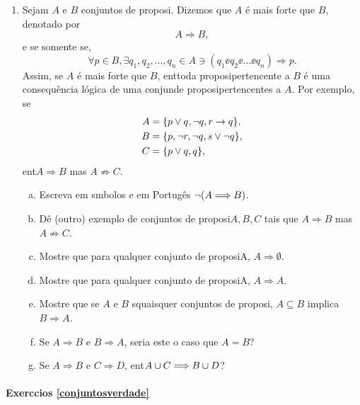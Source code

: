\begin{enumerate}[{\bf 1.}]
\item Sejam $A$ e $B$ conjuntos de proposi\cois. Dizemos que $A$ \'e mais forte que $B$, denotado por
\[
A\Longrightarrow B,
\]
e se somente se,
\[
\forall p\in B,\exists q_1,q_2,...,q_n \in A \ni (q_1\ee q_2\ee ... \ee q_n)\Rightarrow p.
\]
Assim, se $A$ \'e mais forte que $B$, ent\ao toda proposi\cao pertencente a $B$ \'e uma consequ\^encia l\'ogica de uma conjun\cao de proposi\coes pertencentes a $A$. Por exemplo, se
\begin{equation*}
 \begin{aligned}
A&=\{p\vee q, \lnot q, r\to q\},\\
B&=\{p, \lnot r, \lnot q, s\vee\lnot q\},\\
C&=\{p\vee q,q\},
 \end{aligned}
\end{equation*}
ent\ao $A\Longrightarrow B$ mas $A\not\Longrightarrow C$.
\begin{enumerate}[a)]
\item Escreva em s\ih mbolos e em Portug\^es $\lnot(A\Longrightarrow B)$.
\item D\^e (outro) exemplo de conjuntos de proposi\coes $A,B,C$ tais que $A\Longrightarrow B$ mas $A\not\Longrightarrow C$. 
\item Mostre que para qualquer conjunto de proposi\coes A, $A\Longrightarrow \emptyset$.
\item Mostre que para qualquer conjunto de proposi\coes A, $A\Longrightarrow A$.
\item Mostre que se $A$ e $B$ s\ao quaisquer conjuntos de proposi\cois, $A\subseteq B$ implica $B\Longrightarrow A$.
\item Se $A\Longrightarrow B$ e $B\Longrightarrow A$, seria este o caso que $A=B$?
\item Se $A \Longrightarrow B$ e $C\Longrightarrow D$, ent\ao $A\cup C\Longrightarrow B\cup D$?
\end{enumerate}
\end{enumerate}
\paragraph{Exerc\ih cios \ref{conjuntosverdade}}

